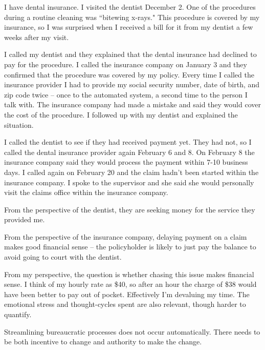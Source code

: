 \begin{mdframed}[frametitle={Dental Insurance},frametitlerule=true,frametitlealignment=\centering]
I have dental insurance. I visited the dentist December 2. One of the procedures during a routine cleaning was ``bitewing x-rays." This procedure is covered by my insurance, so I was surprised when I received a bill for it from my dentist a few weeks after my visit.

I called my dentist and they explained that the dental insurance had declined to pay for the procedure. I called the insurance company on January 3 and they confirmed that the procedure was covered by my policy. 
Every time I called the insurance provider I had to provide my social security number, date of birth, and zip code twice -- once to the automated system, a second time to the person I talk with. The insurance company had made a mistake and said they would cover the cost of the procedure. I followed up with my dentist and explained the situation.

I called the dentist to see if they had received payment yet. They had not, so I called the dental insurance provider again February 6 and 8. On February 8 the insurance company said they would process the payment within 7-10 business days. I called again on February 20 and the claim hadn't been started within the insurance company. I spoke to the supervisor and she said she would personally visit the claims office within the insurance company.

From the perspective of the dentist, they are seeking money for the service they provided me.

From the perspective of the insurance company, delaying payment on a claim makes good financial sense -- the policyholder is likely to just pay the balance to avoid going to court with the dentist.

From my perspective, the question is whether chasing this issue makes financial sense. I think of my hourly rate as \$40, so after an hour the charge of \$38 would have been better to pay out of pocket. Effectively I'm devaluing my time. The emotional stress and thought-cycles spent are also relevant, though harder to quantify.

Streamlining bureaucratic processes does not occur automatically. There needs to be both incentive to change and authority to make the change. 
\end{mdframed}

